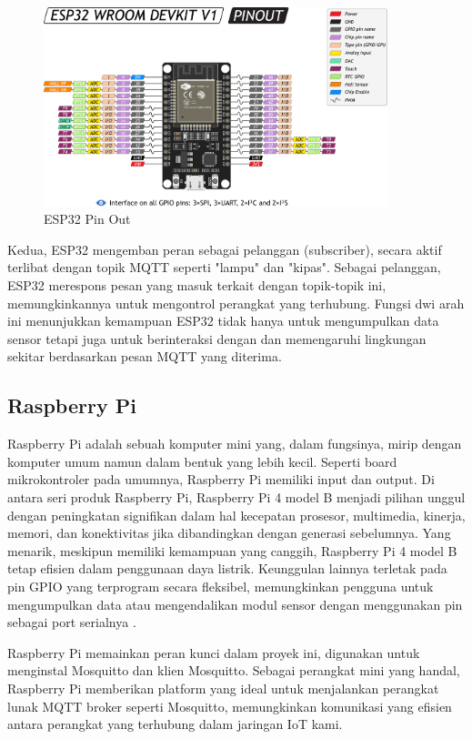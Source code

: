 \begin{figure}[H]
    \centering
    \includegraphics[width=10cm]{image/eps32pinout.png}
    \caption{ESP32 Pin Out}
    \label{fig:esp32}
\end{figure}

Kedua, ESP32 mengemban peran sebagai pelanggan (subscriber), secara aktif terlibat dengan topik MQTT seperti "lampu" dan "kipas". Sebagai pelanggan, ESP32 merespons pesan yang masuk terkait dengan topik-topik ini, memungkinkannya untuk mengontrol perangkat yang terhubung. Fungsi dwi arah ini menunjukkan kemampuan ESP32 tidak hanya untuk mengumpulkan data sensor tetapi juga untuk berinteraksi dengan dan memengaruhi lingkungan sekitar berdasarkan pesan MQTT yang diterima.


\subsection{Raspberry Pi}


Raspberry Pi adalah sebuah komputer mini yang, dalam fungsinya, mirip dengan komputer umum namun dalam bentuk yang lebih kecil. Seperti board mikrokontroler pada umumnya, Raspberry Pi memiliki input dan output. Di antara seri produk Raspberry Pi, Raspberry Pi 4 model B menjadi pilihan unggul dengan peningkatan signifikan dalam hal kecepatan prosesor, multimedia, kinerja, memori, dan konektivitas jika dibandingkan dengan generasi sebelumnya. Yang menarik, meskipun memiliki kemampuan yang canggih, Raspberry Pi 4 model B tetap efisien dalam penggunaan daya listrik. Keunggulan lainnya terletak pada pin GPIO yang terprogram secara fleksibel, memungkinkan pengguna untuk mengumpulkan data atau mengendalikan modul sensor dengan menggunakan pin sebagai port serialnya \cite{raspi}.

Raspberry Pi memainkan peran kunci dalam proyek ini, digunakan untuk menginstal Mosquitto dan klien Mosquitto. Sebagai perangkat mini yang handal, Raspberry Pi memberikan platform yang ideal untuk menjalankan perangkat lunak MQTT broker seperti Mosquitto, memungkinkan komunikasi yang efisien antara perangkat yang terhubung dalam jaringan IoT kami.

